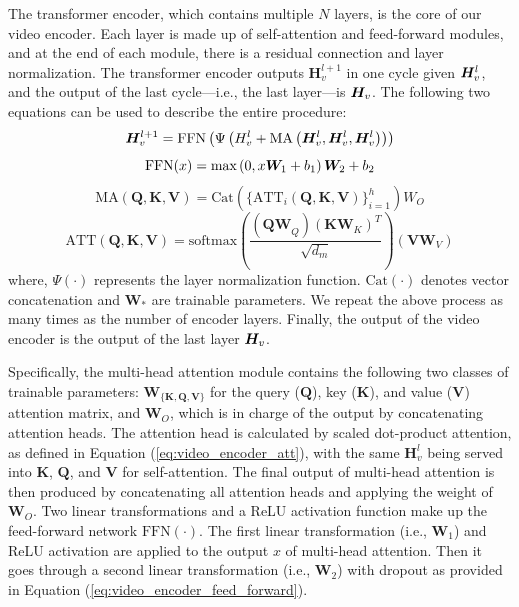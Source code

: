 The transformer encoder, which contains multiple $N$ layers, is the core of our video encoder.
Each layer is made up of self-attention and feed-forward modules, and at the end of each module, there is a residual connection and layer normalization.
The transformer encoder outputs $\bm{H}_v^{l+1}$  in one cycle given $\bm{H}_v^l$, and the output of the last cycle---i.e., the last layer---is $\bm{H}_v$.
The following two equations can be used to describe the entire procedure:
\begin{equation}
  \bm{H}_v^{l+1} = \text{FFN}\left(\Psi \left(H_v^l + \text{MA}\left( \bm{H}_v^l, \bm{H}_v^l, \bm{H}_v^l \right) \right)\right)
  \label{eq:video_encoder_self_attention}
\end{equation}
\begin{equation}
  \text{FFN}(x) = \text{max} \left(0, x\bm{W}_1 + b_1 \right)\bm{W}_2 + b_2
  \label{eq:video_encoder_feed_forward}
\end{equation}
\begin{equation}
    \text{MA}(\bm{Q}, \bm{K}, \bm{V}) = \text{Cat}(\{\text{ATT}_i(\bm{Q}, \bm{K}, \bm{V})\}_{i=1}^h)W_O
  \end{equation}
  \begin{equation}
    \text{ATT}(\bm{Q}, \bm{K}, \bm{V}) = \text{softmax}( \frac{(\bm{QW}_Q)(\bm{K}\bm{W}_K)^T}{\sqrt{d_m}} ) (\bm{VW}_V)
  \label{eq:video_encoder_att}
\end{equation}
where, $\Psi\left(\cdot\right)$ represents the layer normalization function.
$\text{Cat}(\cdot)$ denotes vector concatenation and $\bm{W}_*$ are trainable parameters.
We repeat the above process as many times as the number of encoder layers.
Finally, the output of the video encoder is the output of the last layer $\bm{H}_v$.

Specifically, the multi-head attention module contains the following two classes of trainable parameters: $\bm{W}_{\{\bm{K},\bm{Q},\bm{V}\}}$ for the query ($\bm{Q}$), key ($\bm{K}$), and value ($\bm{V}$) attention matrix, and $\bm{W}_O$, which is in charge of the output by concatenating attention heads.
The attention head is calculated by scaled dot-product attention, as defined in Equation (\ref{eq:video_encoder_att}), with the same $\bm{H}_v^l$ being served into $\bm{K}$, $\bm{Q}$, and $\bm{V}$ for self-attention.
The final output of multi-head attention is then produced by concatenating all attention heads and applying the weight of $\bm{W}_O$. 
Two linear transformations and a ReLU \cite{agarap2018deep} activation function make up the feed-forward network $\text{FFN}(\cdot)$.
The first linear transformation (i.e., $\bm{W}_1$) and ReLU activation are applied to the output $x$ of multi-head attention. Then it goes through a second linear transformation (i.e., $\bm{W}_2$) with dropout as provided in Equation (\ref{eq:video_encoder_feed_forward}).

